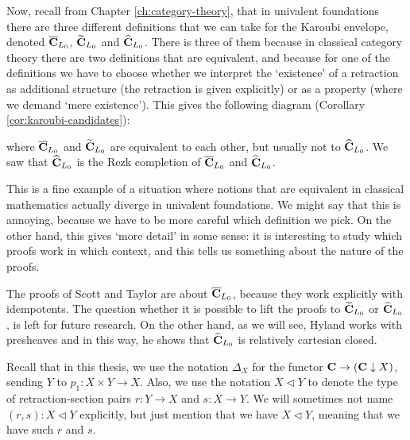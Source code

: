 Now, recall from Chapter \ref{ch:category-theory}, that in univalent foundations there are three different definitions that we can take for the Karoubi envelope, denoted $ \overline {\mathbf{C}}_{L_0} $, $ \widetilde {\mathbf{C}}_{L_0} $ and $ \widehat {\mathbf{C}}_{L_0} $. There is three of them because in classical category theory there are two definitions that are equivalent, and because for one of the definitions we have to choose whether we interpret the `existence' of a retraction as additional structure (the retraction is given explicitly) or as a property (where we demand `mere existence'). This gives the following diagram (Corollary \ref{cor:karoubi-candidates}):
\begin{center}
\end{center}
where $ \overline {\mathbf{C}}_{L_0} $ and $ \widetilde {\mathbf{C}}_{L_0} $ are equivalent to each other, but usually not to $ \widehat {\mathbf{C}}_{L_0} $. We saw that $ \widehat {\mathbf{C}}_{L_0} $ is the Rezk completion of $ \overline {\mathbf{C}}_{L_0} $ and $ \widetilde {\mathbf{C}}_{L_0} $.

This is a fine example of a situation where notions that are equivalent in classical mathematics actually diverge in univalent foundations. We might say that this is annoying, because we have to be more careful which definition we pick. On the other hand, this gives `more detail' in some sense: it is interesting to study which proofs work in which context, and this tells us something about the nature of the proofs.

The proofs of Scott and Taylor are about $ \overline {\mathbf{C}}_{L_0} $, because they work explicitly with idempotents. The question whether it is possible to lift the proofs to $ \widetilde {\mathbf{C}}_{L_0} $ or $ \widehat {\mathbf{C}}_{L_0} $, is left for future research. On the other hand, as we will see, Hyland works with presheaves and in this way, he shows that $ \widehat {\mathbf{C}}_{L_0} $ is relatively cartesian closed.

Recall that in this thesis, we use the notation $ \Delta_X $ for the functor $ \mathbf{C} \to (\mathbf{C} \downarrow X) $, sending $ Y $ to $ p_1 : X \times Y \to X $. Also, we use the notation $ X \triangleleft Y $ to denote the type of retraction-section pairs $ r: Y \to X $ and $ s: X \to Y $. We will sometimes not name $ (r, s) : X \triangleleft Y $ explicitly, but just mention that we have $ X \triangleleft Y $, meaning that we have such $ r $ and $ s $.

